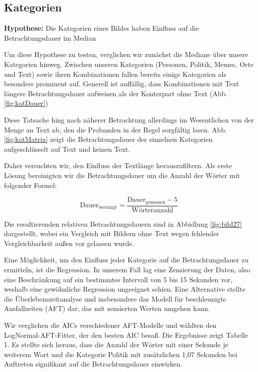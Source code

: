 \documentclass[
    language=german, %
    thesis=seminar, %
    supervisor=postdoc, %
    multiauthor=true, %
    ]{settings/csssa-thesis}
\begin{document}
\subsection{Kategorien}
\textbf{Hypothese:} Die Kategorien eines Bildes haben Einfluss auf die Betrachtungsdauer im Median 

Um diese Hypothese zu testen, verglichen wir zunächst die Mediane über unsere Kategorien hinweg. 
Zwischen unseren Kategorien (Personen, Politik, Memes, Orte und Text) sowie ihren Kombinationen 
fallen bereits einige Kategorien als besonders prominent auf. Generell ist auffällig, dass 
Kombinationen mit Text längere Betrachtungsdauer aufweisen als der Konterpart ohne Text (Abb. \ref{fig:katDauer}) 

Diese Tatsache hing nach näherer Betrachtung allerdings im Wesentlichen von der Menge an Text ab,
den die Probanden in der Regel sorgfältig lasen. Abb. \ref{fig:katMatrix} zeigt die Betrachtungsdauer der einzelnen 
Kategorien aufgeschlüsselt auf Text und keinen Text. 

Daher versuchten wir, den Einfluss der Textlänge herauszufiltern. Als erste Lösung bereinigten 
wir die Betrachtungsdauer um die Anzahl der Wörter mit folgender Formel:

\[
\text{Dauer}_{\text{bereinigt}} = \frac{\text{Dauer}_{\text{gemessen}} - 5}{\text{Wörteranzahl}}
\]


Die resultierenden relativen Betrachtungsdauern sind in Abbidlung \ref{fig:bild27} dargestellt, 
wobei ein Vergleich mit Bildern ohne Text wegen fehlender Vergleichbarkeit außen vor gelassen wurde.

Eine Möglichkeit, um den Einfluss jeder Kategorie auf die Betrachtungsdauer zu ermitteln, 
ist die Regression. In unserem Fall lag eine Zensierung der Daten, also eine Beschränkung 
auf ein bestimmtes Intervall von 5 bis 15 Sekunden vor, weshalb eine gewöhnliche Regression 
ungeeignet schien. Eine Alternative stellte die Überlebenszeitanalyse und insbesondere das Modell 
für beschleunigte Ausfallzeiten (AFT) dar, das mit zensierten Werten umgehen kann.

Wir verglichen die AICs verschiedener AFT-Modelle und wählten den LogNormal-AFT-Fitter, 
der den besten AIC besaß. Die Ergebnisse zeigt Tabelle 1. Es stellte sich heraus, dass die Anzahl 
der Wörter mit einer Sekunde je weiterem Wort und die Kategorie Politik mit zusätzlichen 1,07 Sekunden 
bei Auftreten signifikant auf die Betrachtungsdauer einwirken.
\end{document}
